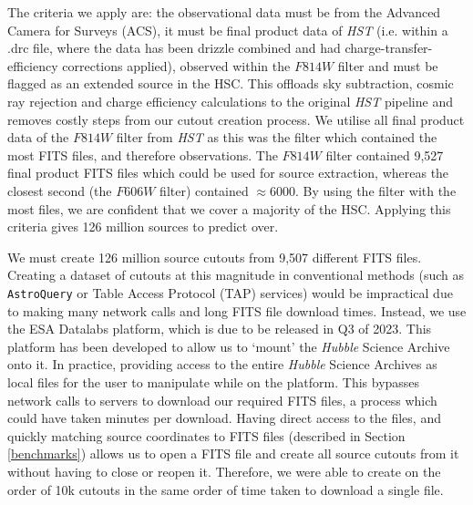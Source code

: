 The criteria we apply are: the observational data must be from the Advanced Camera for Surveys (ACS), it must be final product data of \emph{HST} (i.e. within a .drc file, where the data has been drizzle \citep{2015ASPC..495..281A} combined and had charge-transfer-efficiency corrections applied), observed within the $F814W$ filter and must be flagged as an extended source in the HSC. This offloads sky subtraction, cosmic ray rejection and charge efficiency calculations to the original \emph{HST} pipeline and removes costly steps from our cutout creation process. We utilise all final product data of the $F814W$ filter from \emph{HST} as this was the filter which contained the most FITS files, and therefore observations. The $F814W$ filter contained 9,527 final product FITS files which could be used for source extraction, whereas the closest second (the $F606W$ filter) contained $\approx$6000. By using the filter with the most files, we are confident that we cover a majority of the HSC. Applying this criteria gives 126 million sources to predict over.

We must create 126 million source cutouts from 9,507 different FITS files. Creating a dataset of cutouts at this magnitude in conventional methods (such as \texttt{AstroQuery} or Table Access Protocol (TAP) services) would be impractical due to making many network calls and long FITS file download times. Instead, we use the ESA Datalabs platform, which is due to be released in Q3 of 2023. This platform has been developed to allow us to `mount' the \emph{Hubble} Science Archive onto it. In practice, providing access to the entire \emph{Hubble} Science Archives as local files for the user to manipulate while on the platform. This bypasses network calls to servers to download our required FITS files, a process which could have taken minutes per download. Having direct access to the files, and quickly matching source coordinates to FITS files (described in Section \ref{benchmarks}) allows us to open a FITS file and create all source cutouts from it without having to close or reopen it. Therefore, we were able to create on the order of 10k cutouts in the same order of time taken to download a single file.

